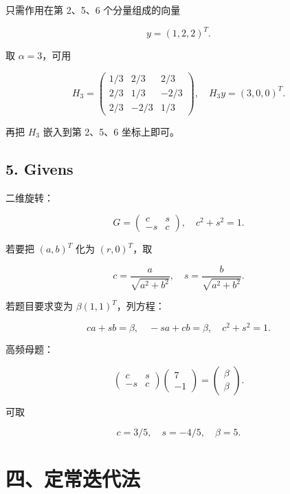 \documentclass[11pt,a4paper]{ctexart}
\begin{document}
只需作用在第 2、5、6 个分量组成的向量

\[
y=(1,2,2)^T.
\]

取 $\alpha=3$，可用

\[
H_3=
\begin{pmatrix}
1/3&2/3&2/3\\
2/3&1/3&-2/3\\
2/3&-2/3&1/3
\end{pmatrix},
\quad H_3y=(3,0,0)^T.
\]

再把 $H_3$ 嵌入到第 2、5、6 坐标上即可。


\subsection*{5. Givens}


二维旋转：

\[
G=
\begin{pmatrix}
c&s\\
-s&c
\end{pmatrix},\quad c^2+s^2=1.
\]

若要把 $(a,b)^T$ 化为 $(r,0)^T$，取

\[
c=\frac a{\sqrt{a^2+b^2}},\quad s=\frac b{\sqrt{a^2+b^2}}.
\]

若题目要求变为 $\beta(1,1)^T$，列方程：

\[
ca+sb=\beta,\quad -sa+cb=\beta,\quad c^2+s^2=1.
\]

高频母题：

\[
\begin{pmatrix}c&s\\-s&c\end{pmatrix}
\begin{pmatrix}7\\-1\end{pmatrix}
=\begin{pmatrix}\beta\\\beta\end{pmatrix}.
\]

可取

\[
c=3/5,\quad s=-4/5,\quad \beta=5.
\]


\section*{四、定常迭代法}

\end{document}
